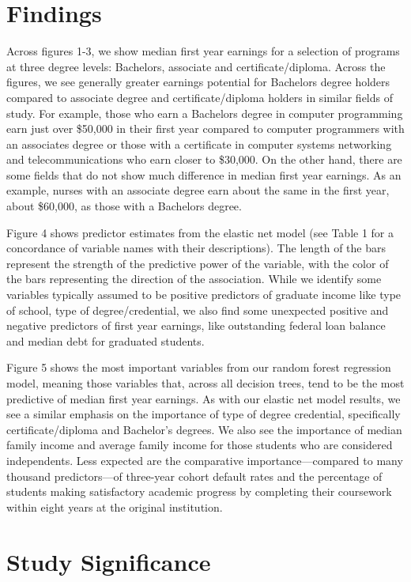\documentclass[a4paper, 12pt]{article}
\begin{document}
\section*{Findings}

Across figures 1-3, we show median first year earnings for a selection of programs at three degree levels: Bachelors, associate and certificate/diploma. Across the figures, we see generally greater earnings potential for Bachelors degree holders compared to associate degree and certificate/diploma holders in similar fields of study. For example, those who earn a Bachelors degree in computer programming earn just over \$50,000 in their first year compared to computer programmers with an associates degree or those with a certificate in computer systems networking and telecommunications who earn closer to \$30,000. On the other hand, there are some fields that do not show much difference in median first year earnings. As an example, nurses with an associate degree earn about the same in the first year, about \$60,000, as those with a Bachelors degree.

Figure 4 shows predictor estimates from the elastic net model (see Table 1 for a concordance of variable names with their descriptions). The length of the bars represent the strength of the predictive power of the variable, with the color of the bars representing the direction of the association. While we identify some variables typically assumed to be positive predictors of graduate income like type of school, type of degree/credential, we also find some unexpected positive and negative predictors of first year earnings, like outstanding federal loan balance and median debt for graduated students.

Figure 5 shows the most important variables from our random forest regression model, meaning those variables that, across all decision trees, tend to be the most predictive of median first year earnings. As with our elastic net model results, we see a similar emphasis on the importance of type of degree credential, specifically certificate/diploma and Bachelor's degrees. We also see the importance of median family income and average family income for those students who are considered independents. Less expected are the comparative importance---compared to many thousand predictors---of three-year cohort default rates and the percentage of students making satisfactory academic progress by completing their coursework within eight years at the original institution.

\section*{Study Significance}
\end{document}
